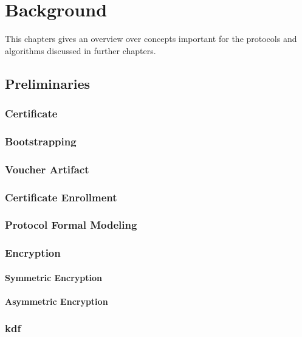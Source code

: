 \chapter{Background}
\label{ch:background}

This chapters gives an overview over concepts important for the protocols and algorithms discussed in further chapters.
\section{Preliminaries}

\subsection{Certificate}

\subsection{Bootstrapping}

\subsection{Voucher Artifact}

\subsection{Certificate Enrollment}

\subsection{Protocol Formal Modeling}

\subsection{Encryption}
	\subsubsection{Symmetric Encryption}
	\subsubsection{Asymmetric Encryption}
	
\subsection{\acrfull*{kdf}} \label{backgroung:kdf}


